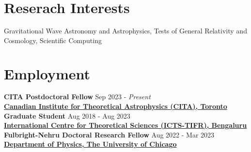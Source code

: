 		
		\section{Reserach Interests}
		Gravitational Wave Astronomy and Astrophysics, Tests of General Relativity and Cosmology, Scientific Computing 
		\\
		
		\section{Employment}
        \textbf{CITA Postdoctoral Fellow} \hfill Sep 2023 - \textit{Present}
		\\
            \vspace{0.4em}\textbf{\href{https://www.cita.utoronto.ca/}{Canadian Institute for Theoretical Astrophysics (CITA), Toronto}}\\
            \textbf{Graduate Student} \hfill Aug 2018 - Aug 2023
		\\
		\vspace{0.4em}\textbf{\href{https://www.icts.res.in/}{International Centre for Theoretical Sciences (ICTS-TIFR), Bengaluru}}\\
		\textbf{Fulbright-Nehru Doctoral Research Fellow } \hfill Aug 2022 - Mar 2023
		\\
		\textbf{\href{https://physics.uchicago.edu/}{Department of Physics, The University of Chicago}}
		
		
		
